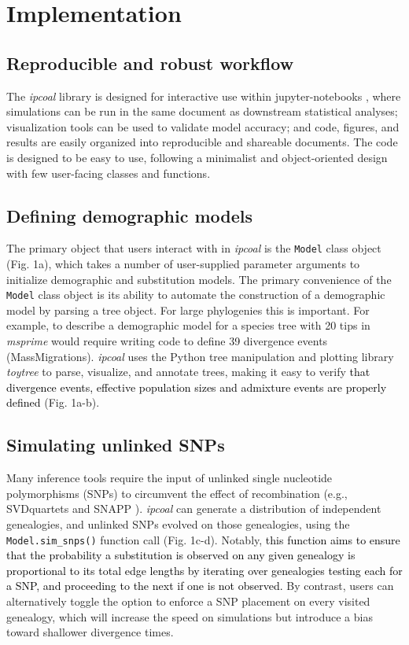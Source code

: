 \documentclass[11pt]{article}
\begin{document}
\section{Implementation}
\label{sec:headings}
\subsection{Reproducible and robust workflow}
The \emph{ipcoal} library is designed for interactive use within jupyter-notebooks \citep{kluyver_jupyter_2016}, where simulations can be run in the same document as downstream statistical analyses; visualization tools can be used to validate model accuracy; and code, figures, and results are easily organized into reproducible and shareable documents. The code is designed to be easy to use, following a minimalist and object-oriented design with few user-facing classes and functions.

\subsection{Defining demographic models}
The primary object that users interact with in \emph{ipcoal} is the \texttt{Model} class object (Fig. 1a), which takes a number of user-supplied parameter arguments to initialize demographic and substitution models. The primary convenience of the \texttt{Model} class object is its ability to automate the construction of a demographic model by parsing a tree object. For large phylogenies this is important. For example, to describe a demographic model for a species tree with 20 tips in \emph{msprime} would require writing code to define 39 divergence events (MassMigrations). \emph{ipcoal} uses the Python tree manipulation and plotting library \emph{toytree} \citep{eaton_toytree_2020} to parse, visualize, and annotate trees, making it easy to verify 
\textcolor{black}{
that divergence events, effective population sizes and admixture events are properly defined} (Fig. 1a-b). 

\subsection{Simulating unlinked SNPs}
Many inference tools require the input of unlinked single nucleotide polymorphisms (SNPs) to circumvent the effect of recombination (e.g., SVDquartets \citep{chifman_quartets_2014} and SNAPP \citep{bryant_snapp_2012}). \emph{ipcoal} can generate a distribution of independent genealogies, and unlinked SNPs evolved on those genealogies, using the \texttt{Model.sim\_snps()} function call (Fig. 1c-d). Notably, \textcolor{black}{this function aims to ensure that the probability a substitution is observed on any given genealogy is proportional to its total edge lengths by iterating over genealogies testing each for a SNP, and proceeding to the next if one is not observed.} By contrast, users can alternatively toggle the option to enforce a SNP placement on every visited genealogy, which will increase the speed on simulations but introduce a bias toward shallower divergence times.
\end{document}
